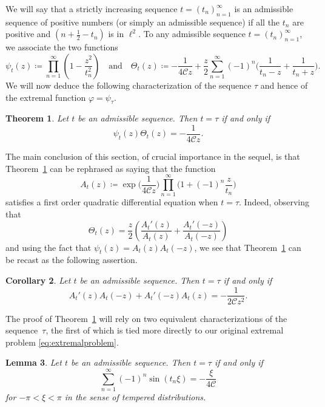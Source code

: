 \documentclass[12pt]{amsart}
\theoremstyle{plain}
\newtheorem{theorem}{Theorem}[section]
\newtheorem{lemma}[theorem]{Lemma}
\newtheorem{corollary}[theorem]{Corollary}
\numberwithin{equation}{section}
\theoremstyle{definition}
\newcommand{\Cone}{\mathscr{C}}
\begin{document}
We will say that a strictly increasing sequence $t=(t_n)_{n=1}^\infty$ is an admissible sequence of positive numbers (or simply an admissible sequence) if all the $t_n$ are positive and $(n+\frac12-t_n)$ is in $\ell^2$.
To any admissible sequence $t=(t_n)_{n=1}^\infty$, we associate the two functions
\begin{equation} \label{eq:theta} \psi_t(z)\coloneqq \prod_{n=1}^\infty \left(1-\frac{z^2}{t_n^2}\right) \quad \text{and} \quad \Theta_t(z)\coloneqq -\frac{1}{4\Cone z}+\frac{z}{2}\sum_{n=1}^\infty (-1)^n\Big(\frac{1}{t_n-z}+\frac{1}{t_n+z}\Big). \end{equation}
We will now deduce the following characterization of the sequence $\tau$ and hence of the extremal function $\varphi=\psi_\tau$.
\begin{theorem}\label{thm:charphi}  Let $t$ be an admissible sequence. Then $t=\tau$ if and only if
\begin{equation} \label{eq:charphi}
	 \psi_t(z) \Theta_t(z)=-\frac{1}{4\Cone z}.
\end{equation}
\end{theorem}
The main conclusion of this section, of crucial importance in the sequel, is that Theorem~\ref{thm:charphi} can be rephrased as saying that the function
	\[ A_t(z) \coloneqq \exp\Big(\frac{1}{4\Cone z}\Big)\prod_{n=1}^\infty \Big(1+(-1)^n\frac{z}{t_n}\Big) \]
	satisfies a first order quadratic differential equation when $t=\tau$. Indeed, observing that
	\[ \Theta_t(z)= \frac{z}{2}\left(\frac{A_t'(z)}{A_t(z)}+\frac{A_t'(-z)}{A_t(-z)}\right) \]
and using the fact that $\psi_t(z)=A_t(z)A_t(-z)$, we see that Theorem~\ref{thm:charphi} can be recast as the following assertion.
\begin{corollary}\label{thm:diff} Let $t$ be an admissible sequence. Then $t=\tau$ if and only if
	\begin{equation} \label{eq:Aeq}
	A_t'(z)A_t(-z)+A_t'(-z)A_t(z)=-\frac{1}{2\Cone z^2}.
	\end{equation}
\end{corollary}

The proof of Theorem~\ref{thm:charphi} will rely on two equivalent characterizations of the sequence~$\tau$, the first of which is tied more directly to our original extremal problem \eqref{eq:extremalproblem}.
\begin{lemma} \label{lem:summform}
Let $t$ be an admissible sequence. Then $t=\tau$ if and only if
\begin{equation}  \sum_{n=1}^\infty  (-1)^{n}\sin (t_n \xi) = - \frac{\xi}{4\Cone}  \label{eq:dercond}  \end{equation}
for $-\pi < \xi < \pi$ in the sense of tempered distributions.
\end{lemma}
\end{document}
